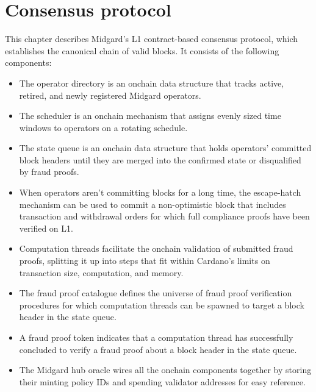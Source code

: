 \documentclass[../midgard.tex]{subfiles}
\begin{document}
\chapter{Consensus protocol}
\label{h:consensus-protocol}

This chapter describes Midgard's L1 contract-based consensus protocol, which establishes the canonical chain of valid blocks.
It consists of the following components:

\begin{itemize}
    \item The operator directory is an onchain data structure that tracks active, retired, and newly registered Midgard operators.
    \item The scheduler is an onchain mechanism that assigns evenly sized time windows to operators on a rotating schedule.
    \item The state queue is an onchain data structure that holds operators' committed block headers until they are merged into the confirmed state or disqualified by fraud proofs.
    \item When operators aren't committing blocks for a long time, the escape-hatch mechanism can be used to commit a non-optimistic block that includes transaction and withdrawal orders for which full compliance proofs have been verified on L1.
    \item Computation threads facilitate the onchain validation of submitted fraud proofs, splitting it up into steps that fit within Cardano's limits on transaction size, computation, and memory.
    \item The fraud proof catalogue defines the universe of fraud proof verification procedures for which computation threads can be spawned to target a block header in the state queue.
    \item A fraud proof token indicates that a computation thread has successfully concluded to verify a fraud proof about a block header in the state queue.
    \item The Midgard hub oracle wires all the onchain components together by storing their minting policy IDs and spending validator addresses for easy reference.
\end{itemize}
\end{document}
